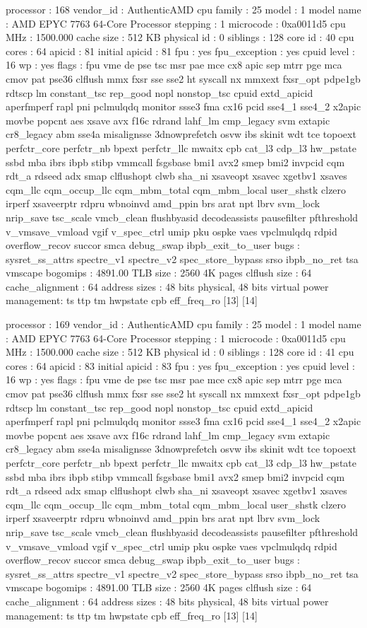 processor	: 168
vendor_id	: AuthenticAMD
cpu family	: 25
model		: 1
model name	: AMD EPYC 7763 64-Core Processor
stepping	: 1
microcode	: 0xa0011d5
cpu MHz		: 1500.000
cache size	: 512 KB
physical id	: 0
siblings	: 128
core id		: 40
cpu cores	: 64
apicid		: 81
initial apicid	: 81
fpu		: yes
fpu_exception	: yes
cpuid level	: 16
wp		: yes
flags		: fpu vme de pse tsc msr pae mce cx8 apic sep mtrr pge mca cmov pat pse36 clflush mmx fxsr sse sse2 ht syscall nx mmxext fxsr_opt pdpe1gb rdtscp lm constant_tsc rep_good nopl nonstop_tsc cpuid extd_apicid aperfmperf rapl pni pclmulqdq monitor ssse3 fma cx16 pcid sse4_1 sse4_2 x2apic movbe popcnt aes xsave avx f16c rdrand lahf_lm cmp_legacy svm extapic cr8_legacy abm sse4a misalignsse 3dnowprefetch osvw ibs skinit wdt tce topoext perfctr_core perfctr_nb bpext perfctr_llc mwaitx cpb cat_l3 cdp_l3 hw_pstate ssbd mba ibrs ibpb stibp vmmcall fsgsbase bmi1 avx2 smep bmi2 invpcid cqm rdt_a rdseed adx smap clflushopt clwb sha_ni xsaveopt xsavec xgetbv1 xsaves cqm_llc cqm_occup_llc cqm_mbm_total cqm_mbm_local user_shstk clzero irperf xsaveerptr rdpru wbnoinvd amd_ppin brs arat npt lbrv svm_lock nrip_save tsc_scale vmcb_clean flushbyasid decodeassists pausefilter pfthreshold v_vmsave_vmload vgif v_spec_ctrl umip pku ospke vaes vpclmulqdq rdpid overflow_recov succor smca debug_swap ibpb_exit_to_user
bugs		: sysret_ss_attrs spectre_v1 spectre_v2 spec_store_bypass srso ibpb_no_ret tsa vmscape
bogomips	: 4891.00
TLB size	: 2560 4K pages
clflush size	: 64
cache_alignment	: 64
address sizes	: 48 bits physical, 48 bits virtual
power management: ts ttp tm hwpstate cpb eff_freq_ro [13] [14]

processor	: 169
vendor_id	: AuthenticAMD
cpu family	: 25
model		: 1
model name	: AMD EPYC 7763 64-Core Processor
stepping	: 1
microcode	: 0xa0011d5
cpu MHz		: 1500.000
cache size	: 512 KB
physical id	: 0
siblings	: 128
core id		: 41
cpu cores	: 64
apicid		: 83
initial apicid	: 83
fpu		: yes
fpu_exception	: yes
cpuid level	: 16
wp		: yes
flags		: fpu vme de pse tsc msr pae mce cx8 apic sep mtrr pge mca cmov pat pse36 clflush mmx fxsr sse sse2 ht syscall nx mmxext fxsr_opt pdpe1gb rdtscp lm constant_tsc rep_good nopl nonstop_tsc cpuid extd_apicid aperfmperf rapl pni pclmulqdq monitor ssse3 fma cx16 pcid sse4_1 sse4_2 x2apic movbe popcnt aes xsave avx f16c rdrand lahf_lm cmp_legacy svm extapic cr8_legacy abm sse4a misalignsse 3dnowprefetch osvw ibs skinit wdt tce topoext perfctr_core perfctr_nb bpext perfctr_llc mwaitx cpb cat_l3 cdp_l3 hw_pstate ssbd mba ibrs ibpb stibp vmmcall fsgsbase bmi1 avx2 smep bmi2 invpcid cqm rdt_a rdseed adx smap clflushopt clwb sha_ni xsaveopt xsavec xgetbv1 xsaves cqm_llc cqm_occup_llc cqm_mbm_total cqm_mbm_local user_shstk clzero irperf xsaveerptr rdpru wbnoinvd amd_ppin brs arat npt lbrv svm_lock nrip_save tsc_scale vmcb_clean flushbyasid decodeassists pausefilter pfthreshold v_vmsave_vmload vgif v_spec_ctrl umip pku ospke vaes vpclmulqdq rdpid overflow_recov succor smca debug_swap ibpb_exit_to_user
bugs		: sysret_ss_attrs spectre_v1 spectre_v2 spec_store_bypass srso ibpb_no_ret tsa vmscape
bogomips	: 4891.00
TLB size	: 2560 4K pages
clflush size	: 64
cache_alignment	: 64
address sizes	: 48 bits physical, 48 bits virtual
power management: ts ttp tm hwpstate cpb eff_freq_ro [13] [14]

